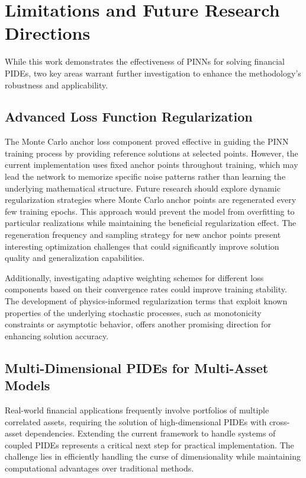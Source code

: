 \documentclass[11pt,twoside,openright]{report}
\begin{document}
\section{Limitations and Future Research Directions}

While this work demonstrates the effectiveness of PINNs for solving financial PIDEs, two key areas warrant further investigation to enhance the methodology's robustness and applicability.

\subsection{Advanced Loss Function Regularization}

The Monte Carlo anchor loss component proved effective in guiding the PINN training process by providing reference solutions at selected points. However, the current implementation uses fixed anchor points throughout training, which may lead the network to memorize specific noise patterns rather than learning the underlying mathematical structure. Future research should explore dynamic regularization strategies where Monte Carlo anchor points are regenerated every few training epochs. This approach would prevent the model from overfitting to particular realizations while maintaining the beneficial regularization effect. The regeneration frequency and sampling strategy for new anchor points present interesting optimization challenges that could significantly improve solution quality and generalization capabilities.

Additionally, investigating adaptive weighting \cite{wang2025simulating} schemes for different loss components based on their convergence rates could improve training stability. The development of physics-informed regularization terms that exploit known properties of the underlying stochastic processes, such as monotonicity constraints or asymptotic behavior, offers another promising direction for enhancing solution accuracy.

\subsection{Multi-Dimensional PIDEs for Multi-Asset Models}

Real-world financial applications frequently involve portfolios of multiple correlated assets, requiring the solution of high-dimensional PIDEs with cross-asset dependencies. Extending the current framework to handle systems of coupled PIDEs represents a critical next step for practical implementation. The challenge lies in efficiently handling the curse of dimensionality while maintaining computational advantages over traditional methods.
\end{document}
